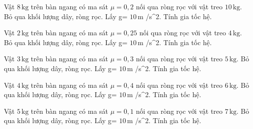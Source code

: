 \begin{ex}
Vật $8\,\text{kg}$ trên bàn ngang có ma sát $\mu=0,2$ nối qua ròng rọc với vật treo $10\,\text{kg}$. Bỏ qua khối lượng dây, ròng rọc. Lấy g= $10\,\text{m}$ /s^2. Tính gia tốc hệ.
\end{ex}

\begin{ex}
Vật $2\,\text{kg}$ trên bàn ngang có ma sát $\mu=0,25$ nối qua ròng rọc với vật treo $4\,\text{kg}$. Bỏ qua khối lượng dây, ròng rọc. Lấy g= $10\,\text{m}$ /s^2. Tính gia tốc hệ.
\end{ex}

\begin{ex}
Vật $3\,\text{kg}$ trên bàn ngang có ma sát $\mu=0,3$ nối qua ròng rọc với vật treo $5\,\text{kg}$. Bỏ qua khối lượng dây, ròng rọc. Lấy g= $10\,\text{m}$ /s^2. Tính gia tốc hệ.
\end{ex}

\begin{ex}
Vật $4\,\text{kg}$ trên bàn ngang có ma sát $\mu=0,4$ nối qua ròng rọc với vật treo $6\,\text{kg}$. Bỏ qua khối lượng dây, ròng rọc. Lấy g= $10\,\text{m}$ /s^2. Tính gia tốc hệ.
\end{ex}

\begin{ex}
Vật $5\,\text{kg}$ trên bàn ngang có ma sát $\mu=0,1$ nối qua ròng rọc với vật treo $7\,\text{kg}$. Bỏ qua khối lượng dây, ròng rọc. Lấy g= $10\,\text{m}$ /s^2. Tính gia tốc hệ.
\end{ex}

